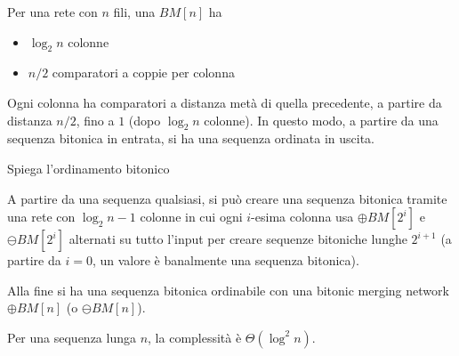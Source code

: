 \begin{questions}
\begin{solution}
        Per una rete con $n$ fili, una $BM[n]$ ha
        \begin{itemize}
            \item $\log_2 n$ colonne
            
            \item $n/2$ comparatori a coppie per colonna
        \end{itemize}
        
        Ogni colonna ha comparatori a distanza metà di quella precedente, a partire da distanza $n/2$, fino a $1$ (dopo $\log_2 n$ colonne). In questo modo, a partire da una sequenza bitonica in entrata, si ha una sequenza ordinata in uscita.
    \end{solution}
    
    \question Spiega l'ordinamento bitonico
    
    \begin{solution}
        A partire da una sequenza qualsiasi, si può creare una sequenza bitonica tramite una rete con $\log_2 n - 1$ colonne in cui ogni $i$-esima colonna usa $\oplus BM [2^i]$ e $\ominus BM [2^i]$ alternati su tutto l'input per creare sequenze bitoniche lunghe $2^{i+1}$ (a partire da $i=0$, un valore è banalmente una sequenza bitonica).
        
        Alla fine si ha una sequenza bitonica ordinabile con una bitonic merging network $\oplus BM [n]$ (o $\ominus BM [n]$).
        
        Per una sequenza lunga $n$, la complessità è $\Theta (\log^2 n)$.
    \end{solution}
\end{questions}